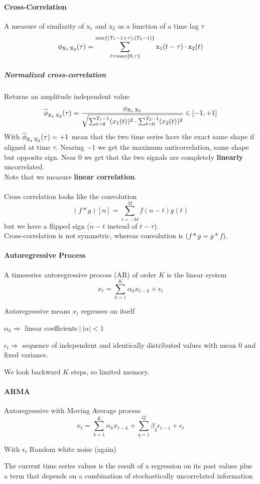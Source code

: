 \documentclass[10pt]{report}
\begin{document}
\paragraph{Cross-Correlation} A measure of similarity of x$_1$ and x$_2$ as a function of a time lag $\tau$ $$\phi_{\hbox{x}_1\:\hbox{x}_2}(\tau)=\sum_{t = \max\{0,\tau\}}^{\min\{(T_1 - 1 + \tau), (T_2 - 1)\}} \hbox{x}_1(t-\tau)\cdot \hbox{x}_2(t)$$
\subparagraph{Normalized cross-correlation} Returns an amplitude independent value
$$\overline{\phi}_{\hbox{x}_1\:\hbox{x}_2}(\tau) = \frac{\phi_{\hbox{x}_1\:\hbox{x}_2}}{\sqrt{\sum_{t=0}^{T_1-1}(x_1(t))^2\cdot\sum_{t=0}^{T_2-1}(x_2(t))^2}} \in [-1,+1]$$
With $\overline{\phi}_{\hbox{x}_1\:\hbox{x}_2}(\tau) = +1$ mean that the two time series have the exact same shape if aligned at time $\tau$. Nearing $-1$ we get the maximum anticorrelation, same shape but opposite sign. Near 0 we get that the two signals are completely \textbf{linearly} uncorrelated.\\
Note that we measure \textbf{linear correlation}.\\\\
Cross correlation looks like the convolution $$(f * g)[n]=\sum_{t=-M}^M f(n-t)g(t)$$ but we have a flipped sign ($n-t$ instead of $t-\tau$).\\
Cross-correlation is not symmetric, whereas convolution is ($f * g = g * f$).
\paragraph{Autoregressive Process} A timeseries autoregressive process (AR) of order $K$ is the linear system $$x_t = \sum_{k=1}^K \alpha_k x_{t-k} + \epsilon_t$$\begin{list}{}{}
	\item Autoregressive means $x_t$ regresses on itself
	\item $\alpha_k \Rightarrow$ linear coefficients$\:|\:|\alpha|<1$
	\item $\epsilon_t\Rightarrow$ sequence of independent and identically distributed values with mean 0 and fixed variance.
	\item We look backward $K$ steps, so limited memory.
\end{list}
\paragraph{ARMA} Autoregressive with Moving Average process $$x_t = \sum_{k=1}^K \alpha_k x_{t-k} + \sum_{q=1}^Q \beta_q\epsilon_{t-1}+\epsilon_t$$
\begin{list}{}{}
	\item With $\epsilon_t$ Random white noise (again)
	\item The current time series values is the result of a regression on its past values plus a term that depends on a combination of stochastically uncorrelated information
\end{list}
\end{document}
